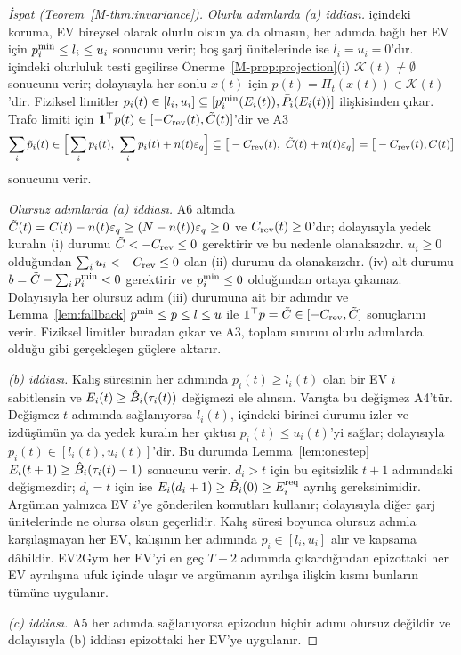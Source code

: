 \begin{proof}[İspat (Teorem~\ref{M-thm:invariance})]
\emph{Olurlu adımlarda (a) iddiası.}
 içindeki koruma, EV bireysel olarak olurlu olsun ya da olmasın, her adımda bağlı her EV için $p^{\min}_i\le l_i\le u_i$ sonucunu verir; boş şarj ünitelerinde ise $l_i=u_i=0$'dır.
 içindeki olurluluk testi geçilirse Önerme~\ref{M-prop:projection}(i) $\mathcal K(t)\neq\emptyset$ sonucunu verir; dolayısıyla her sonlu $x(t)$ için $p(t)=\Pi_t(x(t))\in\mathcal K(t)$'dir.
Fiziksel limitler $p_i(t)\in[l_i,u_i]\subseteq[p^{\min}_i(E_i(t)),\bar P_i(E_i(t))]$ ilişkisinden çıkar.
Trafo limiti için $\mathbf 1^\top p(t)\in[-C_{\mathrm{rev}}(t),\tilde C(t)]$'dir ve A3
\[
\sum_i\tilde p_i(t)\in\Big[\sum_ip_i(t),\ \sum_ip_i(t)+n(t)\varepsilon_q\Big]\subseteq\big[-\Crev(t),\ \Ctil(t)+n(t)\varepsilon_q\big]=\big[-\Crev(t),C(t)\big]
\]
sonucunu verir.

\emph{Olursuz adımlarda (a) iddiası.}
A6 altında $\tilde C(t)=C(t)-n(t)\varepsilon_q\ge(N-n(t))\varepsilon_q\ge0$ ve $C_{\mathrm{rev}}(t)\ge0$'dır; dolayısıyla yedek kuralın (i) durumu $\tilde C<-C_{\mathrm{rev}}\le0$ gerektirir ve bu nedenle olanaksızdır.
$u_i\ge0$ olduğundan $\sum_iu_i<-C_{\mathrm{rev}}\le0$ olan (ii) durumu da olanaksızdır.
(iv) alt durumu $b=\tilde C-\sum_ip^{\min}_i<0$ gerektirir ve $p^{\min}_i\le0$ olduğundan ortaya çıkamaz.
Dolayısıyla her olursuz adım (iii) durumuna ait bir adımdır ve Lemma~\ref{lem:fallback} $p^{\min}\le p\le l\le u$ ile $\mathbf 1^\top p=\tilde C\in[-C_{\mathrm{rev}},\tilde C]$ sonuçlarını verir.
Fiziksel limitler buradan çıkar ve A3, toplam sınırını olurlu adımlarda olduğu gibi gerçekleşen güçlere aktarır.

\emph{(b) iddiası.}
Kalış süresinin her adımında $p_i(t)\ge l_i(t)$ olan bir EV $i$ sabitlensin ve $E_i(t)\ge\hat B_i(\tau_i(t))$ değişmezi ele alınsın.
Varışta bu değişmez A4'tür.
Değişmez $t$ adımında sağlanıyorsa $l_i(t)$,  içindeki birinci durumu izler ve izdüşümün ya da yedek kuralın her çıktısı $p_i(t)\le u_i(t)$'yi sağlar; dolayısıyla $p_i(t)\in[l_i(t),u_i(t)]$'dir.
Bu durumda Lemma~\ref{lem:onestep} $E_i(t+1)\ge\hat B_i(\tau_i(t)-1)$ sonucunu verir.
$d_i>t$ için bu eşitsizlik $t+1$ adımındaki değişmezdir; $d_i=t$ için ise $E_i(d_i+1)\ge\hat B_i(0)\ge E^{\mathrm{req}}_i$ ayrılış gereksinimidir.
Argüman yalnızca EV $i$'ye gönderilen komutları kullanır; dolayısıyla diğer şarj ünitelerinde ne olursa olsun geçerlidir.
Kalış süresi boyunca olursuz adımla karşılaşmayan her EV, kalışının her adımında $p_i\in[l_i,u_i]$ alır ve kapsama dâhildir.
EV2Gym her EV'yi en geç $T-2$ adımında çıkardığından epizottaki her EV ayrılışına ufuk içinde ulaşır ve argümanın ayrılışa ilişkin kısmı bunların tümüne uygulanır.

\emph{(c) iddiası.}
A5 her adımda sağlanıyorsa epizodun hiçbir adımı olursuz değildir ve dolayısıyla (b) iddiası epizottaki her EV'ye uygulanır.
\end{proof}

